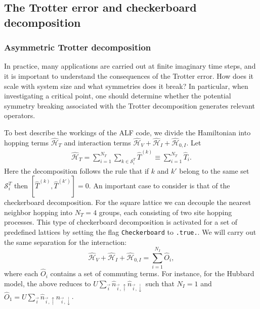 %



\subsection{The Trotter error and  checkerboard  decomposition }\label{sec:trotter}
%

\subsubsection{Asymmetric  Trotter decomposition}
In practice, many applications are carried out at finite  imaginary time steps,  and it is important to  understand the consequences of the Trotter error.
How does it scale with system size and  what  symmetries  does it break?
In particular, when investigating a critical point, one should determine whether the potential symmetry breaking  associated  with the Trotter decomposition generates relevant operators.

To best describe the workings of the ALF  code,  we divide the Hamiltonian into  hopping terms  $\hat{\mathcal{H}}_{T}$  and interaction terms  
$\hat{\mathcal{H}}_{V} +  \hat{\mathcal{H}}_{I}   +   \hat{\mathcal{H}}_{0,I} $.       Let 
\begin{align}
\label{Checkerboard.Eq}
	\hat{\mathcal{H}}_{T}     = \sum_{i=1}^{N_T} \sum_{k \in \mathcal{S}^{T}_i} \hat{T}^{(k)}  \equiv \sum_{i=1}^{N_T} \hat{T}_{i}.
\end{align}
Here the decomposition follows the rule  that if $k$ and $k'$  belong to the same set $\mathcal{S}^{T}_i $ then   $ \left[ \hat{T}^{(k)} , \hat{T}^{(k')} \right] = 0 $.  An important case to consider is that of the checkerboard decomposition.
For the square lattice we can decouple the nearest neighbor hopping  into $N_T=4$ groups,  each consisting of two site hopping processes.
This type of checkerboard decomposition is activated for a set  of predefined lattices by setting the flag  \texttt{Checkerboard} to \texttt{.true.}.
We will carry out the same separation for the interaction: 
\begin{equation}
	\hat{\mathcal{H}}_{V}  +  \hat{\mathcal{H}}_{I}   +   \hat{\mathcal{H}}_{0,I}   = \sum_{i=1}^{N_I}  \hat{O}_{i},
\end{equation}
where each $\hat{O}_{i}$  contains a set of commuting terms.  For instance, for the Hubbard model,   the  above reduces to 
$U \sum_{\vec{i}}  \hat{n}_{\vec{i},\uparrow } \hat{n}_{\vec{i},\downarrow }  $    such that $N_I = 1$ and   $ \hat{O}_{1} = U \sum_{\vec{i}}  \hat{n}_{\vec{i},\uparrow } \hat{n}_{\vec{i},\downarrow }   $. 

